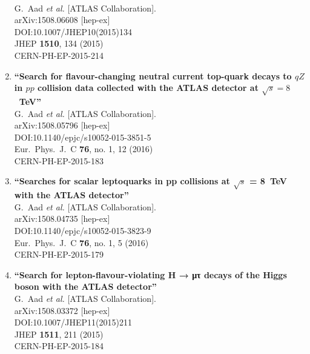 \documentclass{article}
\begin{document}
\begin{enumerate}
  \\{}G.~Aad {\it et al.} [ATLAS Collaboration].
  \\{}arXiv:1508.06608 [hep-ex]
  \\{}DOI:10.1007/JHEP10(2015)134
  \\{}JHEP {\bf 1510}, 134 (2015)
  \\{}CERN-PH-EP-2015-214
\item%
{\bf ``Search for flavour-changing neutral current top-quark decays to $qZ$ in $pp$ collision data collected with the ATLAS detector at $\sqrt s =8$  TeV''}
  \\{}G.~Aad {\it et al.} [ATLAS Collaboration].
  \\{}arXiv:1508.05796 [hep-ex]
  \\{}DOI:10.1140/epjc/s10052-015-3851-5
  \\{}Eur.\ Phys.\ J.\ C {\bf 76}, no. 1, 12 (2016)
  \\{}CERN-PH-EP-2015-183
\item%
{\bf ``Searches for scalar leptoquarks in pp collisions at $\sqrt{s}$ = 8 TeV with the ATLAS detector''}
  \\{}G.~Aad {\it et al.} [ATLAS Collaboration].
  \\{}arXiv:1508.04735 [hep-ex]
  \\{}DOI:10.1140/epjc/s10052-015-3823-9
  \\{}Eur.\ Phys.\ J.\ C {\bf 76}, no. 1, 5 (2016)
  \\{}CERN-PH-EP-2015-179
\item%
{\bf ``Search for lepton-flavour-violating H → μτ decays of the Higgs boson with the ATLAS detector''}
  \\{}G.~Aad {\it et al.} [ATLAS Collaboration].
  \\{}arXiv:1508.03372 [hep-ex]
  \\{}DOI:10.1007/JHEP11(2015)211
  \\{}JHEP {\bf 1511}, 211 (2015)
  \\{}CERN-PH-EP-2015-184

\end{enumerate}
\end{document}

